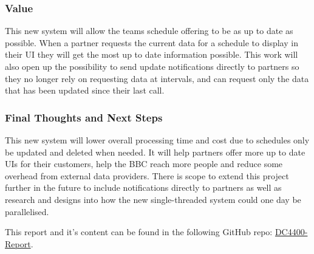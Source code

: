 \subsubsection*{Value}
This new system will allow the teams schedule offering to be as up to date as possible. When a partner requests the current data for a schedule to display in 
their UI they will get the most up to date information possible. This work will also open up the possibility to send update notifications directly to partners
so they no longer rely on requesting data at intervals, and can request only the data that has been updated since their last call.

\subsubsection*{Final Thoughts and Next Steps}
This new system will lower overall processing time and cost due to schedules only be updated and deleted when needed. It will help partners offer more up to 
date UIs for their customers, help the BBC reach more people and reduce some overhead from external data providers. There is scope to extend this project 
further in the future to include notifications directly to partners as well as research and designs into how the new single-threaded system could one day 
be parallelised.

\vspace{0.2cm}
\noindent This report and it's content can be found in the following GitHub repo: \href{https://github.com/OMBowkerBBC/DC4400-Report}{DC4400-Report}.

\newpage
